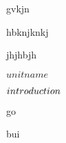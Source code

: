 \documentclass[a5paper]{book}
\begin{document}



gvkjn

hbknjknkj

jhjhbjh


\unit{ $ unit name $ }
{
	\introduction
	{ 
		$introduction\\$ 
	}

	go

	bui

}
\end{document}
